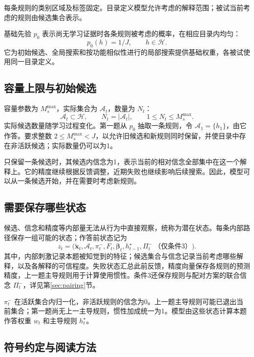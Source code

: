 \documentclass[12pt]{article}
\begin{document}
每条规则的类别区域及标签固定。目录定义模型允许考虑的解释范围；被试当前考虑的规则由候选集合表示。

基础先验 $p_0$ 表示尚无学习证据时各条规则被考虑的概率，在相应目录内均匀：
\begin{equation}
p_0(h)=1/J,\qquad h\in\mathcal H.
\label{eq:base-prior}
\end{equation}
它为初始候选、全局搜索和按功能相似性进行的局部搜索提供基础权重，各被试使用同一目录定义。

\subsection{容量上限与初始候选}

容量参数为 $M_s^{\max}$，实际集合为 $\mathcal A_t$，数量为 $N_t$：
\begin{equation}
\mathcal A_t\subset\mathcal H,\qquad N_t=|\mathcal A_t|,\qquad
1\leq N_t\leq M_s^{\max}.
\label{eq:capacity}
\end{equation}
实际候选数量随学习过程变化。第一题从 $p_0$ 抽取一条规则，令 $\mathcal A_1=\{h_1\}$，由它作答。要求整数 $2\leq M_s^{\max}<J$，以允许旧候选和新规则同时保留，并使目录中存在非活跃候选；实际数量仍可以为1。

只保留一条候选时，其候选内信念为1，表示当前的相对信念全部集中在这一个解释上。它的精度继续根据反馈调整，近期失败也继续影响后续搜索。因此，模型可以从一条候选开始，并在需要时考虑新规则。

\subsection{需要保存哪些状态}

候选、信念和精度等内部量无法从行为中直接观察，统称为潜在状态。每条内部路径保存一组可能的状态；作答前状态记为
\begin{equation}
z_t=\bigl(\widetilde{\bm x}_t,\mathcal A_t,\pi_t^-,F_t,
\bm\beta_t,h_{t-1}^{\star},\Pi_t^-\ \text{（仅条件3）}\bigr).
\end{equation}
其中，内部刺激记录本题被知觉到的特征；候选集合与信念记录当前考虑哪些解释，以及各解释的可信程度。失败状态汇总此前反馈，精度向量保存各规则的预测精度，上一题主导规则用于计算使用惯性。条件3还保存规则与配对方案的联合信念 $\Pi_t^-$，详见第\ref{sec:pairing}节。

$\pi_t^-$ 在活跃集合内归一化，非活跃规则的信念为0。上一题主导规则可能已退出当前集合；第一题尚无上一主导规则，惯性加成统一为1。模型由这些状态计算本题作答权重 $w_t$ 和主导规则 $h_t^{\star}$。

\subsection{符号约定与阅读方法}
\label{sec:notation}
\end{document}
